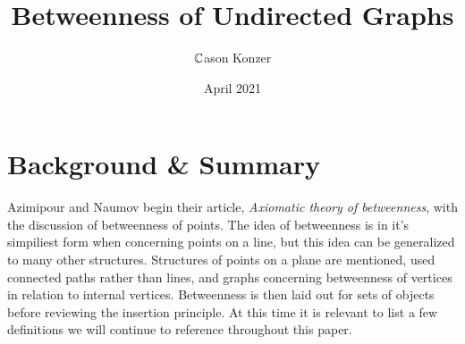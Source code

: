 \documentclass[a4paper,man,natbib]{apa6}
\title{Betweenness of Undirected Graphs}
\author{$ \mathbb{C} $ason Konzer}
\date{April 2021}
\affiliation{University of Michigan \\ Mathematics}
\begin{document}
\maketitle

\section{Background \& Summary}
\label{sec: The Lay of The Land}
      Azimipour and Naumov begin their article, \textit{Axiomatic theory of betweenness}, with the discussion of betweenness of points.
The idea of betweenness is in it's simpiliest form when concerning points on a line, but this idea can be generalized to many other structures.
Structures of points on a plane are mentioned, used connected paths rather than lines, and graphs concerning betweenness of vertices in relation to internal vertices.
Betweenness is then laid out for sets of objects before reviewing the insertion principle. At this time it is relevant to list a few definitions we will continue to reference throughout this paper.
\end{document}
